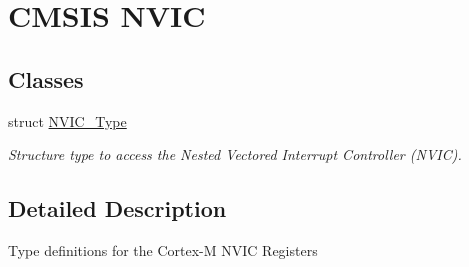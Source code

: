 \hypertarget{group___c_m_s_i_s___n_v_i_c}{\section{\-C\-M\-S\-I\-S \-N\-V\-I\-C}
\label{group___c_m_s_i_s___n_v_i_c}
}
\subsection*{\-Classes}
\begin{DoxyCompactItemize}
\item 
struct \hyperlink{struct_n_v_i_c___type}{\-N\-V\-I\-C\-\_\-\-Type}
\begin{DoxyCompactList}\small\item\em \-Structure type to access the \-Nested \-Vectored \-Interrupt \-Controller (\-N\-V\-I\-C). \end{DoxyCompactList}\end{DoxyCompactItemize}


\subsection{\-Detailed \-Description}
\-Type definitions for the \-Cortex-\/\-M \-N\-V\-I\-C \-Registers 